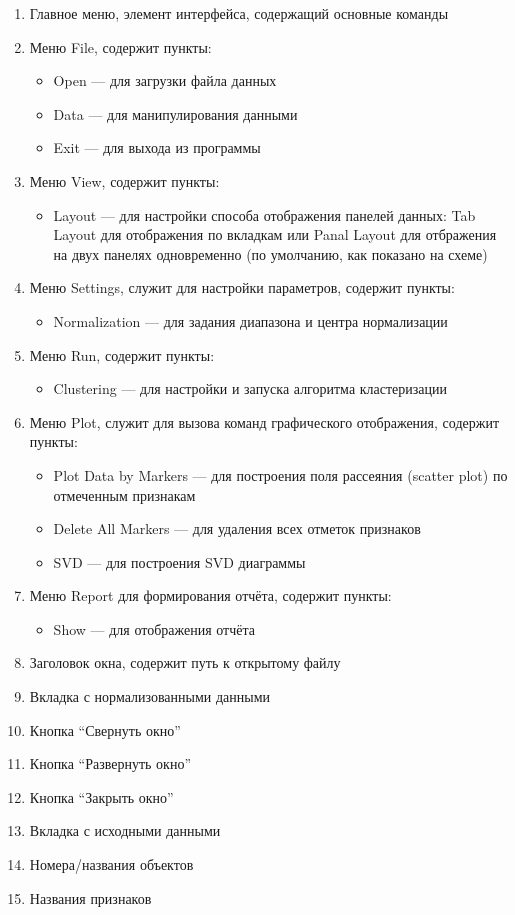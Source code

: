 \documentclass[12pt]{instruction}
\begin{document}
\begin{enumerate}
	\item Главное меню, элемент интерфейса, содержащий основные команды
	\item Меню File, содержит пункты:
		\begin{itemize}
			\item Open --- для загрузки файла данных
			\item Data --- для манипулирования данными
			\item Exit --- для выхода из программы
		\end{itemize}
	\item Меню View, содержит пункты:
		\begin{itemize}
			\item Layout --- для настройки способа отображения панелей данных: Tab Layout для отображения по вкладкам или Panal Layout для отбражения на двух панелях одновременно (по умолчанию, как показано на схеме) 
		\end{itemize}
	\item Меню Settings, служит для настройки параметров, содержит пункты:
		\begin{itemize}
			\item Normalization --- для задания диапазона и центра нормализации
		\end{itemize}
	\item Меню Run, содержит пункты:
		\begin{itemize}
			\item Clustering --- для настройки и запуска алгоритма кластеризации
		\end{itemize}
	\item Меню Plot, служит для вызова команд графического отображения, содержит пункты:
		\begin{itemize}
			\item Plot Data by Markers --- для построения поля рассеяния (scatter plot) по отмеченным признакам
			\item Delete All Markers --- для удаления всех отметок признаков
			\item SVD --- для построения SVD диаграммы 			
		\end{itemize}
	\item Меню Report для формирования отчёта, содержит пункты:
		\begin{itemize}
			\item Show --- для отображения отчёта 		
		\end{itemize}
	\item Заголовок окна, содержит путь к открытому файлу
	\item Вкладка с нормализованными данными 
	\item Кнопка ``Свернуть окно''
	\item Кнопка ``Развернуть окно''		
	\item Кнопка ``Закрыть окно''
	\item Вкладка с исходными данными 
	\item Номера/названия объектов
	\item Названия признаков
\end{enumerate}
\end{document}
